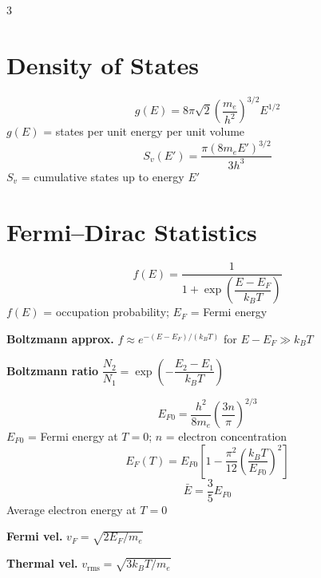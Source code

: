 \documentclass[9pt]{extarticle}
\newcommand{\eqlabel}[1]{\textbf{\scriptsize #1}\;}
\newcommand{\vardef}[1]{{\footnotesize\color{defgray}#1}}
\begin{document}
\begin{multicols}{3}
\section{Density of States}
\[g(E) = 8\pi\sqrt{2}\left(\frac{m_e}{h^2}\right)^{3/2}E^{1/2}\]
\vardef{$g(E)$ = states per unit energy per unit volume}
\[S_v(E') = \frac{\pi(8m_eE')^{3/2}}{3h^3}\]
\vardef{$S_v$ = cumulative states up to energy $E'$}

\section{Fermi--Dirac Statistics}
\[f(E) = \frac{1}{1+\exp\!\left(\dfrac{E-E_F}{k_BT}\right)}\]
\vardef{$f(E)$ = occupation probability; $E_F$ = Fermi energy}

\eqlabel{Boltzmann approx.} $f \approx e^{-(E-E_F)/(k_BT)}$ for $E-E_F \gg k_BT$

\eqlabel{Boltzmann ratio} $\dfrac{N_2}{N_1} = \exp\!\left(-\dfrac{E_2-E_1}{k_BT}\right)$

\[E_{F0} = \frac{h^2}{8m_e}\left(\frac{3n}{\pi}\right)^{2/3}\]
\vardef{$E_{F0}$ = Fermi energy at $T=0$; $n$ = electron concentration}
\[E_F(T) = E_{F0}\!\left[1 - \frac{\pi^2}{12}\!\left(\frac{k_BT}{E_{F0}}\right)^{\!2}\right]\]
\[\bar{E} = \frac{3}{5}E_{F0}\]
\vardef{Average electron energy at $T=0$}

\eqlabel{Fermi vel.} $v_F = \sqrt{2E_F/m_e}$

\eqlabel{Thermal vel.} $v_{\text{rms}} = \sqrt{3k_BT/m_e}$

\end{multicols}
\newpage
\end{document}
